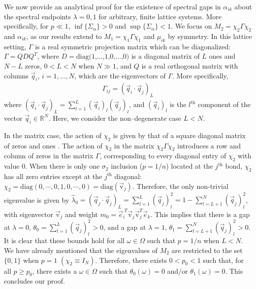 \documentclass[english,12pt,jmp,graphicx]{revtex4-1}
\begin{document}
We now provide an analytical proof for the existence of spectral gaps
in $\alpha_{ik}$ about the spectral endpoints $\lambda=0,1$ for arbitrary, finite
lattice systems. More specifically, for $p\ll1$, $\inf\{\Sigma_\alpha\}>0$ and
$\sup\{\Sigma_\alpha\}<1$. We focus on
$M_2=\chi_2\Gamma\chi_2$ and $\alpha_{ik}$, as our results extend to 
$M_1=\chi_1\Gamma\chi_1$ and $\mu_{ik}$ by symmetry. In this lattice setting, $\Gamma$  
is a real symmetric projection matrix which can be diagonalized:
$\Gamma=QDQ^T$, where 
$D=\text{diag(1,\ldots,1,0,\ldots,0)}$ is a diagonal matrix of $L$ ones
and $N-L$ zeros,
$0<L<N$ when $N\gg1$, and
$Q$ is a real orthogonal matrix with columns $\vec{q}_i$,
$i=1,\ldots,N$, which are the eigenvectors of $\Gamma$. More specifically,
%
\begin{align*}
  \Gamma_{ij}=(\vec{q}_i\cdot\vec{q}_j)_L
\end{align*}
%
where 
$(\vec{q}_i\cdot\vec{q}_j)_L=\sum_{l=1}^L(\vec{q}_i)_l(\vec{q}_j)_l$, and
$(\vec{q}_i)_l$ is the $l^{\text{th}}$ component of the vector
$\vec{q}_i\in\mathbb{R}^N$. Here, we consider the non--degenerate case
$L<N$.

In the matrix case, the action of $\chi_2$ is given by that of a square
diagonal matrix of zeros and ones \cite{Golden:JoB:337}. The action
of $\chi_2$ in the matrix $\chi_2\Gamma\chi_2$ introduces a row and column
of zeros in the matrix $\Gamma$, corresponding to every diagonal entry of
$\chi_2$ with value 0. When there is only one $\sigma_2$ inclusion ($p=1/n$)
located at the $j^{\text{th}}$ bond, $\chi_2$ has all zero entries except
at the $j^{\text{th}}$ diagonal:
$\chi_2=\text{diag}(0,\cdots,0,1,0,\cdots,0)=\text{diag}(\vec{\text{v}}_j)$. Therefore, 
the only non-trivial eigenvalue is given by 
$\hat{\lambda}_0=(\vec{q}_j\cdot\vec{q}_j)_L=\sum_{l=1}^L(\vec{q}_j)_l^2=1-\sum_{l=L+1}^N(\vec{q}_j)_l^2$, 
with eigenvector $\vec{\text{v}}_j$
and weight $m_0=\vec{e}_i^{\;T}\vec{\text{v}}_j\vec{\text{v}}_j^T\vec{e}_k$.
This implies that there is a gap at $\lambda=0$, $\theta_0=\sum_{l=1}^L(\vec{q}_j)_l^2>0$,
and a gap at $\lambda=1$, $\theta_1=\sum_{l=L+1}^N(\vec{q}_j)_l^2>0$. It is clear
that these bounds hold for all $\omega\in\Omega$ such that $p=1/n$ when $L<N$. We
have already mentioned that the eigenvalues of $M_2$ are
restricted to the set $\{0,1\}$ when $p=1$
$(\chi_2\equiv I_N)$. Therefore, there exists $0<p_0<1$ such that,
for all $p\geq p_0$, there exists a $\omega\in\Omega$ such that $\theta_0(\omega)=0$ and/or
$\theta_1(\omega)=0$. This concludes our proof.
\end{document}
